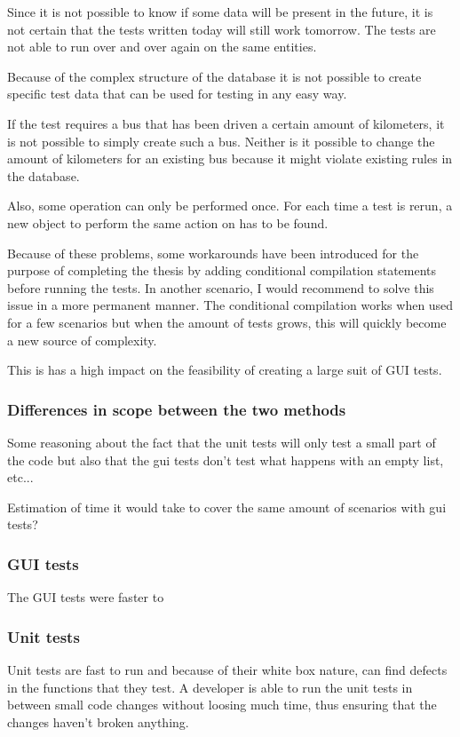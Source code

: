 \documentclass{article}
\begin{document}
			Since it is not possible to know if some data will be present in the future, it is not certain that the tests written today will still work tomorrow. The tests are not able to run over and over again on the same entities. 

			Because of the complex structure of the database it is not possible to create specific test data that can be used for testing in any easy way.

			If the test requires a bus that has been driven a certain amount of kilometers, it is not possible to simply create such a bus. Neither is it possible to change the amount of kilometers for an existing bus because it might violate existing rules in the database. 

			Also, some operation can only be performed once. For each time a test is rerun, a new object to perform the same action on has to be found.

			Because of these problems, some workarounds have been introduced for the purpose of completing the thesis by adding conditional compilation statements before running the tests. In another scenario, I would recommend to solve this issue in a more permanent manner. The conditional compilation works when used for a few scenarios but when the amount of tests grows, this will quickly become a new source of complexity.

			This is has a high impact on the feasibility of creating a large suit of GUI tests. 

			\subsubsection{Differences in scope between the two methods}
			Some reasoning about the fact that the unit tests will only test a small part of the code but also that the gui tests don't test what happens with an empty list, etc...

			Estimation of time it would take to cover the same amount of scenarios with gui tests?

			\subsubsection{GUI tests}
			The GUI tests were faster to 

			\subsubsection{Unit tests}
			Unit tests are fast to run and because of their white box nature, can find defects in the functions that they test. A developer is able to run the unit tests in between small code changes without loosing much time, thus ensuring that the changes haven't broken anything. 
\end{document}
